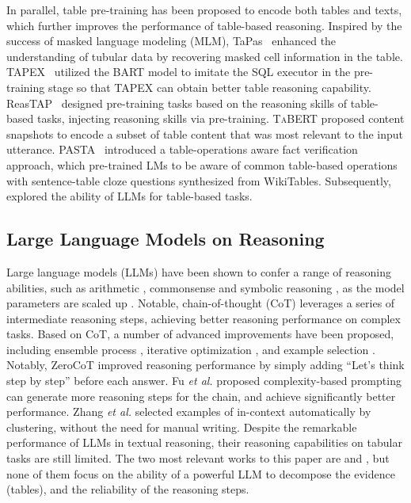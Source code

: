 \documentclass{article}
\begin{document}
In parallel, table pre-training has been proposed to encode both tables and texts, which further improves the performance of table-based reasoning. 
Inspired by the success of masked language modeling (MLM), TaPas~\citep{tapas} enhanced the understanding of tubular data by recovering masked cell information in the table. TAPEX~\citep{tapex} utilized the BART model to imitate the SQL executor in the pre-training stage so that TAPEX can obtain better table reasoning capability. ReasTAP~\citep{reastap} designed pre-training tasks based on the reasoning skills of table-based tasks, injecting reasoning skills via pre-training. 
\textsc{TaBERT} \citep{yin2020tabert} proposed content snapshots to encode a subset of table content that was most relevant to the input utterance. 
PASTA~\citep{pasta} introduced a table-operations aware
fact verification approach, which pre-trained LMs to be aware of common table-based operations with sentence-table cloze questions synthesized from WikiTables.
Subsequently, \citep{llmtab,binder} explored the ability of LLMs for table-based tasks.

\subsection{Large Language Models on Reasoning}
Large language models (LLMs) have been shown to confer a range of reasoning abilities, such as arithmetic \citep{lewkowycz2022solving}, commonsense \citep{liu2022rainier} and symbolic reasoning \citep{zhou2022least}, as the model parameters are scaled up \citep{gpt3}.
Notable, chain-of-thought (CoT) \citep{cot} leverages a series of intermediate reasoning steps, achieving better reasoning performance on complex tasks. 
Based on CoT, a number of advanced improvements have been proposed, including ensemble process \citep{cotsc}, iterative optimization \citep{zelikman2022star}, and example selection \citep{creswell2022selection}.
Notably, ZeroCoT \citep{zerocot} improved reasoning performance by simply adding ``Let's think step by step'' before each answer.
Fu \textit{et al.} \citep{fu2022complexity} proposed complexity-based prompting can generate more reasoning steps for the chain, and achieve significantly better performance.
Zhang \textit{et al.} \citep{zhang2022automatic} selected examples of in-context automatically by clustering, without the need for manual writing.
Despite the remarkable performance of LLMs in textual reasoning, their reasoning capabilities on tabular tasks are still limited.
The two most relevant works to this paper are  \citep{binder} and \citep{llmtab}, but none of them focus on the ability of a powerful LLM to decompose the evidence (tables), and the reliability of the reasoning steps.
\end{document}
